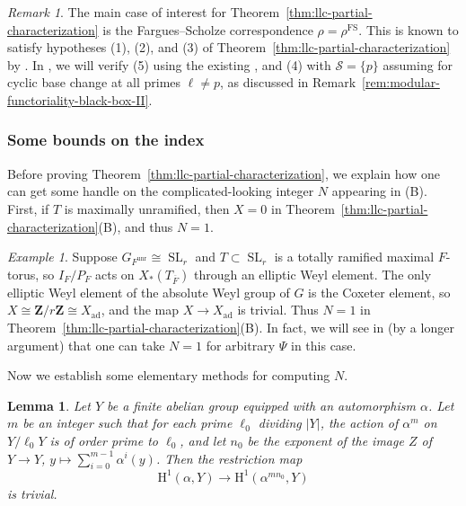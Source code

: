\documentclass[reqno]{amsart}
\numberwithin{equation}{subsection}
\newcommand{\Z}{\mathbf{Z}}
\newcommand{\ol}[1]{\overline{#1}}
\newcommand\cS{\mathcal{S}}
\DeclareMathOperator{\SL}{SL}
\DeclareMathOperator{\ad}{ad}
\DeclareMathOperator{\unr}{unr}
\DeclareMathOperator{\FS}{FS}
\newcommand{\rH}{\ensuremath{\mathrm{H}}\xspace}
\newtheorem{lemma}[thm]{Lemma}
\theoremstyle{remark}
\newtheorem{remark}[thm]{Remark}
\newtheorem{example}[thm]{Example}
\numberwithin{equation}{subsection}
\numberwithin{figure}{subsection}
\begin{document}
\begin{remark}
The main case of interest for Theorem~\ref{thm:llc-partial-characterization} is the Fargues--Scholze correspondence $\rho = \rho^{\FS}$. This is known to satisfy hypotheses (1), (2), and (3) of Theorem~\ref{thm:llc-partial-characterization} by \cite[Theorem I.9.6]{FS}. In \cite{CF26b}, we will verify (5) using the existing \cite[Theorem 1.3.1]{F24}, and (4) with $\cS=\{p\}$ assuming \cite[Hypothesis~4.1.4]{CF26b} for cyclic base change at all primes $\ell \neq p$, as discussed in Remark~\ref{rem:modular-functoriality-black-box-II}.
\end{remark}

\subsubsection{Some bounds on the index}

Before proving Theorem~\ref{thm:llc-partial-characterization}, we explain how one can get some handle on the complicated-looking integer $N$ appearing in (B). First, if $T$ is maximally unramified, then $X = 0$ in Theorem~\ref{thm:llc-partial-characterization}(B), and thus $N = 1$.

\begin{example}\label{ex:llc-slr}
Suppose $G_{F^{\unr}} \cong \SL_r$ and $T \subset \SL_r$ is a totally ramified maximal $F$-torus, so $I_F/P_F$ acts on $X_*(T_{\ol F})$ through an elliptic Weyl element. The only elliptic Weyl element of the absolute Weyl group of $G$ is the Coxeter element, so $X \cong \Z/r\Z \cong X_{\ad}$, and the map $X \to X_{\ad}$ is trivial. Thus $N = 1$ in Theorem~\ref{thm:llc-partial-characterization}(B). In fact, we will see in \cite[Theorem~10.4.3]{CF26b} (by a longer argument) that one can take $N = 1$ for arbitrary $\Psi$ in this case.
\end{example}

Now we establish some elementary methods for computing $N$.

\begin{lemma}\label{lemma:explicit-finite-index-bound}
Let $Y$ be a finite abelian group equipped with an automorphism $\alpha$. Let $m$ be an integer such that for each prime $\ell_0$ dividing $|Y|$, the action of $\alpha^m$ on $Y/\ell_0 Y$ is of order prime to $\ell_0$, and let $n_0$ be the exponent of the image $Z$ of $Y \to Y$, $y \mapsto \sum_{i=0}^{m-1} \alpha^i(y)$. Then the restriction map
\[
\rH^1(\alpha, Y) \to \rH^1(\alpha^{mn_0}, Y)
\]
is trivial.
\end{lemma}
\end{document}
